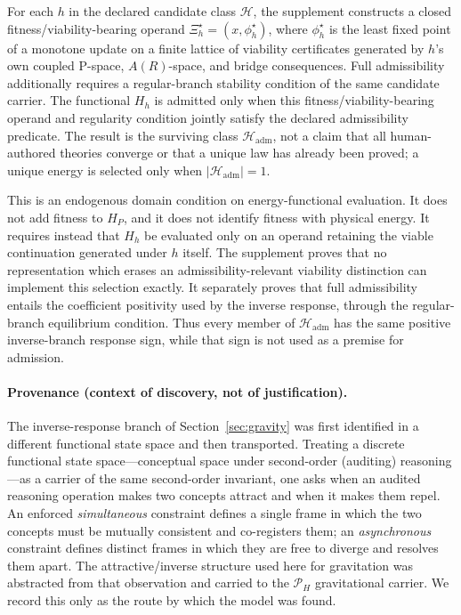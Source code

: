 \documentclass[10pt,twoside,a5paper]{article}
\newcommand{\Pspace}{\ensuremath{\mathcal P_H}}
\theoremstyle{definition}
\begin{document}
For each $h$ in the declared candidate class $\mathcal H$, the supplement
constructs a closed fitness/viability-bearing operand
$\Xi_h^\star=(x,\phi_h^\star)$, where $\phi_h^\star$ is the least fixed point
of a monotone update on a finite lattice of viability certificates generated by
$h$'s own coupled P-space, $A(R)$-space, and bridge consequences.  Full
admissibility additionally requires a regular-branch stability condition of the
same candidate carrier.  The functional $H_h$ is admitted only when this
fitness/viability-bearing operand and regularity condition jointly satisfy the
declared admissibility predicate.  The result is the surviving class
$\mathcal H_{\mathrm{adm}}$, not a claim that all human-authored theories
converge or that a unique law has already been proved; a unique energy is
selected only when $|\mathcal H_{\mathrm{adm}}|=1$.

This is an endogenous domain condition on energy-functional evaluation.  It
does not add fitness to $H_P$, and it does not identify fitness with physical
energy.  It requires instead that $H_h$ be evaluated only on an operand
retaining the viable continuation generated under $h$ itself.  The supplement
proves that no representation which erases an admissibility-relevant viability
distinction can implement this selection exactly.  It separately proves that
full admissibility entails the coefficient positivity used by the inverse
response, through the regular-branch equilibrium condition.  Thus every member
of $\mathcal H_{\mathrm{adm}}$ has the same positive inverse-branch response
sign, while that sign is not used as a premise for admission.

\paragraph{Provenance (context of discovery, not of justification).}
The inverse-response branch of Section~\ref{sec:gravity} was first identified in a
different functional state space and then transported. Treating a discrete
functional state space---conceptual space under second-order (auditing) reasoning---as
a carrier of the same second-order invariant, one asks when an audited reasoning
operation makes two concepts attract and when it makes them repel. An enforced
\emph{simultaneous} constraint defines a single frame in which the two concepts must
be mutually consistent and co-registers them; an \emph{asynchronous} constraint
defines distinct frames in which they are free to diverge and resolves them apart.
The attractive/inverse structure used here for gravitation was abstracted from that
observation and carried to the $\Pspace$ gravitational carrier. We record this only
as the route by which the model was found.
\end{document}
